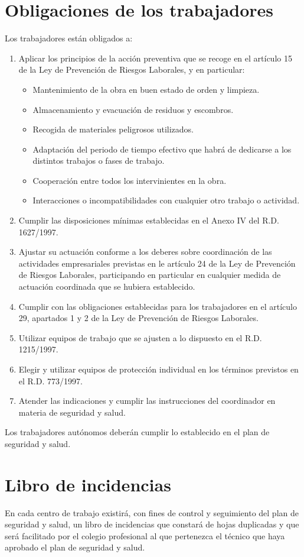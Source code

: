 \section{Obligaciones de los trabajadores}
\label{sec:sys-obligaciones}
Los trabajadores están obligados a:
\begin{enumerate}
    \item Aplicar los principios de la acción preventiva que se recoge en el artículo 15 de la Ley de Prevención de Riesgos Laborales, y en particular:
    \begin{itemize}[label=--]
        \item Mantenimiento de la obra en buen estado de orden y limpieza.
        \item Almacenamiento y evacuación de residuos y escombros.
        \item Recogida de materiales peligrosos utilizados.
        \item Adaptación del periodo de tiempo efectivo que habrá de dedicarse a los distintos trabajos o fases de trabajo.
        \item Cooperación entre todos los intervinientes en la obra.
        \item Interacciones o incompatibilidades con cualquier otro trabajo o actividad.
    \end{itemize}
  \item Cumplir las disposiciones mínimas establecidas en el Anexo IV del R.D. 1627/1997.
  \item Ajustar su actuación conforme a los deberes sobre coordinación de las actividades empresariales previstas en le artículo 24 de la Ley de Prevención de Riesgos Laborales, participando en particular en cualquier medida de actuación coordinada que se hubiera establecido.
  \item Cumplir con las obligaciones establecidas para los trabajadores en el artículo 29, apartados 1 y 2 de la Ley de Prevención de Riesgos Laborales.
  \item Utilizar equipos de trabajo que se ajusten a lo dispuesto en el R.D. 1215/1997.
  \item Elegir y utilizar equipos de protección individual en los términos previstos en el R.D. 773/1997.
  \item Atender las indicaciones y cumplir las instrucciones del coordinador en materia de seguridad y salud.
\end{enumerate}
Los trabajadores autónomos deberán cumplir lo establecido en el plan de seguridad y salud.
\section{Libro de incidencias}
\label{sec:sys-incidencias}
En cada centro de trabajo existirá, con fines de control y seguimiento del plan de seguridad y salud, un libro de incidencias que constará de hojas duplicadas y que será facilitado por el colegio profesional al que pertenezca el técnico que haya aprobado el plan de seguridad y salud.

